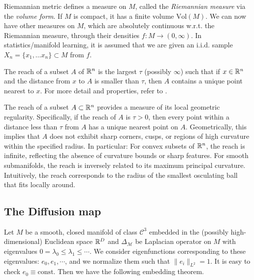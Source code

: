 Riemannian metric defines a measure on $M$, called the {\em Riemannian measure} via the {\em volume form}. If $M$ is compact, it has a finite volume $\text{Vol}(M)$. We can now have other measures on $M$, which are absolutely continuous w.r.t. the Riemannian measure, through their densities $f:M\rightarrow (0,\infty)$.   In statistics/manifold learning, it is assumed that we are given an i.i.d. sample $X_n=\{x_1,\ldots x_n\}\subset M$ from $f$. 


\begin{definition}
	\upshape
	The reach of a subset $A$ of $\mathbb{R}^n$ is the largest $\tau$ (possibly $\infty$) such that if $x \in\mathbb{R}^n$ and the  distance from $x$ to $A$ is smaller than $\tau$, then $A$ contains a unique point nearest to $x$. For more detail and properties, refer to \cite{aamari2019estimating}.
\end{definition}
The reach of a subset $A \subset \mathbb{R}^n$  provides a measure of its local geometric regularity. Specifically, if the reach of  $A$ is $\tau>0$, then every point within a distance less than $\tau$ from $A$ has a unique nearest point on $A$. Geometrically, this implies that $A$ does not exhibit sharp corners, cusps, or regions of high curvature within the specified radius. In particular: For convex subsets of $\mathbb{R}^n$, the reach is infinite, reflecting the absence of curvature bounds or sharp features. For smooth submanifolds, the reach is inversely related to its maximum principal curvature. Intuitively, the reach corresponds to the radius of the smallest osculating ball that fits locally around.




\subsection{The Diffusion map}
\label{embed}
Let $M$ be a smooth, closed manifold of class $\mathcal{C}^3$ embedded in the (possibly high-dimensional) Euclidean space $\mathbb{R}^D$ and $\Delta_{\mathcal{M}}$ be Laplacian operator on $M$ with eigenvalues $0=\lambda_0 \leq \lambda_1 \leq \cdots$. We consider eigenfunctions corresponding to these eigenvalues: $e_0,e_1,\cdots$, and we normalize them such that $\|e_i\|_{L^2}=1$. It is easy to check $e_0 \equiv \mathrm{const}$. Then we have the following embedding theorem.


